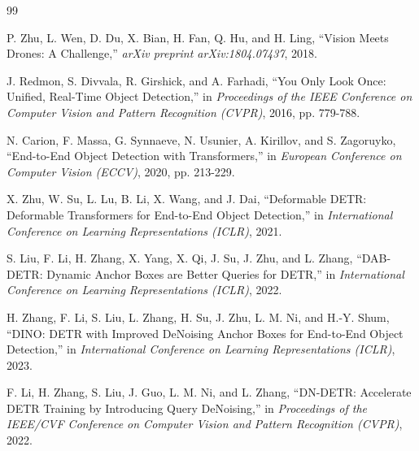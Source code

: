 \documentclass[11pt, conference, onecolumn]{IEEEtran}
\begin{document}
\begin{thebibliography}{99}

P. Zhu, L. Wen, D. Du, X. Bian, H. Fan, Q. Hu, and H. Ling, ``Vision Meets Drones: A Challenge,'' \textit{arXiv preprint arXiv:1804.07437}, 2018.

J. Redmon, S. Divvala, R. Girshick, and A. Farhadi, ``You Only Look Once: Unified, Real-Time Object Detection,'' in \textit{Proceedings of the IEEE Conference on Computer Vision and Pattern Recognition (CVPR)}, 2016, pp. 779-788.

N. Carion, F. Massa, G. Synnaeve, N. Usunier, A. Kirillov, and S. Zagoruyko, ``End-to-End Object Detection with Transformers,'' in \textit{European Conference on Computer Vision (ECCV)}, 2020, pp. 213-229.

X. Zhu, W. Su, L. Lu, B. Li, X. Wang, and J. Dai, ``Deformable DETR: Deformable Transformers for End-to-End Object Detection,'' in \textit{International Conference on Learning Representations (ICLR)}, 2021.

S. Liu, F. Li, H. Zhang, X. Yang, X. Qi, J. Su, J. Zhu, and L. Zhang, ``DAB-DETR: Dynamic Anchor Boxes are Better Queries for DETR,'' in \textit{International Conference on Learning Representations (ICLR)}, 2022.

H. Zhang, F. Li, S. Liu, L. Zhang, H. Su, J. Zhu, L. M. Ni, and H.-Y. Shum, ``DINO: DETR with Improved DeNoising Anchor Boxes for End-to-End Object Detection,'' in \textit{International Conference on Learning Representations (ICLR)}, 2023.

F. Li, H. Zhang, S. Liu, J. Guo, L. M. Ni, and L. Zhang, ``DN-DETR: Accelerate DETR Training by Introducing Query DeNoising,'' in \textit{Proceedings of the IEEE/CVF Conference on Computer Vision and Pattern Recognition (CVPR)}, 2022.

\end{thebibliography}
\end{document}
